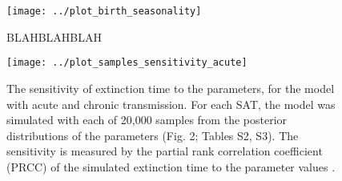 \documentclass[12pt]{article}
\begin{document}
\begin{figure}
  \centering
  \texttt{[image: ../plot\_birth\_seasonality]}
  \caption{BLAHBLAHBLAH}
\end{figure}

\begin{figure}
  \centering
  \texttt{[image: ../plot\_samples\_sensitivity\_acute]}
  \caption{The sensitivity of extinction time to the parameters, for
    the model with acute and chronic transmission. For each SAT, the
    model was simulated with each of 20,000 samples from the posterior
    distributions of the parameters (Fig. 2; Tables S2, S3). The
    sensitivity is measured by the partial rank correlation
    coefficient (PRCC) of the simulated extinction time to the
    parameter values \autocite{blower_1994}.}
\end{figure}


\printbibliography
\end{document}
